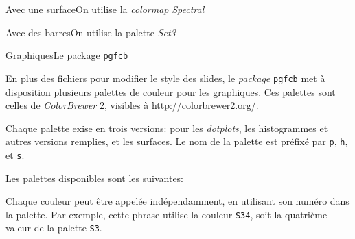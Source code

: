 \documentclass{eecslides}
\begin{document}
	\begin{frame}{Avec une surface}{On utilise la \emph{colormap} \emph{Spectral}}
		\begin{center}
			
		\end{center}	
	\end{frame}

	\begin{frame}{Avec des barres}{On utilise la palette \emph{Set3}}
		\begin{center}
			
		\end{center}	
	\end{frame}

	\begin{frame}[allowframebreaks]{Graphiques}{Le package \texttt{pgfcb}}
	    
		En plus des fichiers pour modifier le style des slides, le \emph{package} \texttt{pgfcb} met à disposition plusieurs palettes de couleur pour les graphiques. Ces palettes sont celles de \emph{ColorBrewer} 2, visibles à \url{http://colorbrewer2.org/}.

		\framebreak

		Chaque palette exise en trois versions: pour les \emph{dotplots}, les histogrammes et autres versions remplies, et les surfaces. Le nom de la palette est préfixé par \texttt{p}, \texttt{h}, et \texttt{s}.

		\framebreak

		Les palettes disponibles sont les suivantes:

		\framebreak

		Chaque \alert{couleur} peut être appelée indépendamment, en utilisant son numéro dans la palette. Par exemple, cette phrase {\color{S34} utilise la couleur \texttt{S34}}, soit la quatrième valeur de la palette \texttt{S3}. 

	\end{frame}
\end{document}
